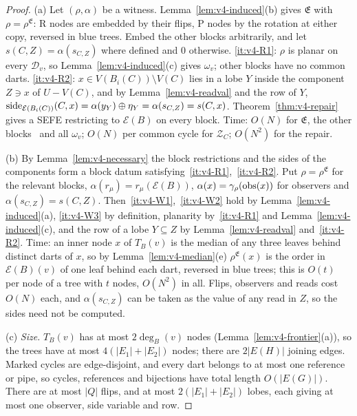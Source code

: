 \begin{proof}
(a) Let $(\rho,\alpha)$ be a witness. Lemma~\ref{lem:v4-induced}(b) gives
$\mathfrak E$ with $\rho=\rho^{\mathfrak E}$: R nodes are embedded by their
flips, P nodes by the rotation at either copy, reversed in blue trees. Embed
the other blocks arbitrarily, and let $s(C,Z)=\alpha(s_{C,Z})$ where defined
and $0$ otherwise. \ref{it:v4-R1}: $\rho$ is planar on every $\mathcal D_v$,
so Lemma~\ref{lem:v4-induced}(c) gives $\omega_v$; other blocks have no
common darts. \ref{it:v4-R2}: $x\in V(B_i(C))\setminus V(C)$ lies in a lobe
$Y$ inside the component $Z\ni x$ of $U-V(C)$, and by
Lemma~\ref{lem:v4-readval} and the row of $Y$,
$\operatorname{side}_{\mathcal E(B_i(C))}(C,x)=\alpha(y_Y)\oplus\eta_Y=\alpha(s_{C,Z})=
s(C,x)$. Theorem~\ref{thm:v4-repair} gives a SEFE restricting to $\mathcal
E(B)$ on every block. Time: $O(N)$ for $\mathfrak E$, the other
blocks~\cite{HT74} and all $\omega_v$; $O(N)$ per common cycle for $\mathcal
Z_C$; $O(N^2)$ for the repair.

(b) By Lemma~\ref{lem:v4-necessary} the block restrictions and the sides of
the components form a block datum satisfying~\ref{it:v4-R1},~\ref{it:v4-R2}.
Put $\rho=\rho^{\mathfrak E}$ for the relevant blocks, $\alpha(r_\mu)=
r_\mu(\mathcal E(B))$, $\alpha(x)=\gamma_\rho(\operatorname{obs}(x))$ for
observers and $\alpha(s_{C,Z})=s(C,Z)$. Then~\ref{it:v4-W1},~\ref{it:v4-W2}
hold by Lemma~\ref{lem:v4-induced}(a), \ref{it:v4-W3} by definition, planarity
by~\ref{it:v4-R1} and Lemma~\ref{lem:v4-induced}(c), and the row of a lobe
$Y\subseteq Z$ by Lemma~\ref{lem:v4-readval} and~\ref{it:v4-R2}. Time: an
inner node $x$ of $T_B(v)$ is the median of any three leaves behind distinct
darts of $x$, so by Lemma~\ref{lem:v4-median}(e) $\rho^{\mathfrak E}(x)$ is
the order in $\mathcal E(B)(v)$ of one leaf behind each dart, reversed in
blue trees; this is $O(t)$ per node of a tree with $t$ nodes, $O(N^2)$ in
all. Flips, observers and reads cost $O(N)$ each, and $\alpha(s_{C,Z})$ can
be taken as the value of any read in $Z$, so the sides need not be computed.

(c) \emph{Size.} $T_B(v)$ has at most $2\deg_B(v)$ nodes
(Lemma~\ref{lem:v4-frontier}(a)), so the trees have at most
$4(|E_1|+|E_2|)$ nodes; there are $2|E(H)|$ joining edges. Marked cycles are
edge-disjoint, and every dart belongs to at most one reference or pipe, so
cycles, references and bijections have total length $O(|E(G)|)$. There are at
most $|Q|$ flips, and at most $2(|E_1|+|E_2|)$ lobes, each giving at most one
observer, side variable and row.


\end{proof}

